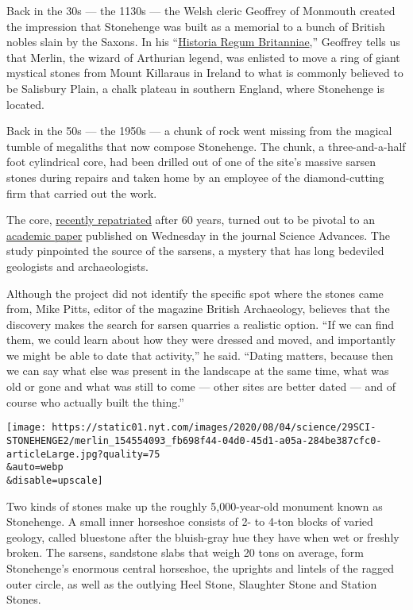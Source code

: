 Back in the 30s --- the 1130s --- the Welsh cleric Geoffrey of Monmouth
created the impression that Stonehenge was built as a memorial to a
bunch of British nobles slain by the Saxons. In his
``\href{https://en.wikipedia.org/wiki/Historia_Regum_Britanniae}{Historia
Regum Britanniae},'' Geoffrey tells us that Merlin, the wizard of
Arthurian legend, was enlisted to move a ring of giant mystical stones
from Mount Killaraus in Ireland to what is commonly believed to be
Salisbury Plain, a chalk plateau in southern England, where Stonehenge
is located.

Back in the 50s --- the 1950s --- a chunk of rock went missing from the
magical tumble of megaliths that now compose Stonehenge. The chunk, a
three-and-a-half foot cylindrical core, had been drilled out of one of
the site's massive sarsen stones during repairs and taken home by an
employee of the diamond-cutting firm that carried out the work.

The core,
\href{https://www.nytimes.com/2019/05/08/world/europe/uk-stonehenge-missing-piece.html}{recently
repatriated} after 60 years, turned out to be pivotal to an
\href{https://advances.sciencemag.org/content/6/31/eabc0133}{academic
paper} published on Wednesday in the journal Science Advances. The study
pinpointed the source of the sarsens, a mystery that has long bedeviled
geologists and archaeologists.

Although the project did not identify the specific spot where the stones
came from, Mike Pitts, editor of the magazine British Archaeology,
believes that the discovery makes the search for sarsen quarries a
realistic option. ``If we can find them, we could learn about how they
were dressed and moved, and importantly we might be able to date that
activity,'' he said. ``Dating matters, because then we can say what else
was present in the landscape at the same time, what was old or gone and
what was still to come --- other sites are better dated --- and of
course who actually built the thing.''

\texttt{[image: https://static01.nyt.com/images/2020/08/04/science/29SCI-STONEHENGE2/merlin\_154554093\_fb698f44-04d0-45d1-a05a-284be387cfc0-articleLarge.jpg?quality=75\\\&auto=webp\\\&disable=upscale]}

Two kinds of stones make up the roughly 5,000-year-old monument known as
Stonehenge. A small inner horseshoe consists of 2- to 4-ton blocks of
varied geology, called bluestone after the bluish-gray hue they have
when wet or freshly broken. The sarsens, sandstone slabs that weigh 20
tons on average, form Stonehenge's enormous central horseshoe, the
uprights and lintels of the ragged outer circle, as well as the outlying
Heel Stone, Slaughter Stone and Station Stones.

